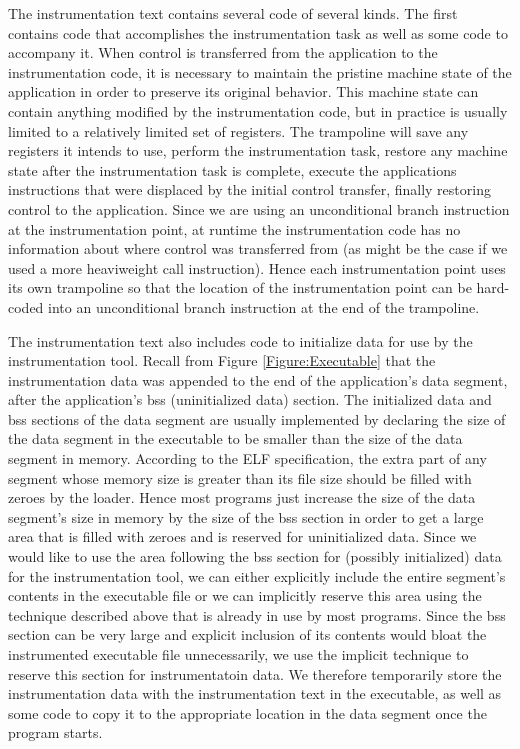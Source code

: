 The instrumentation text contains several code of several kinds. The first
contains code that accomplishes the instrumentation task as well as some code to
accompany it. When control is transferred from the application to the
instrumentation code, it is necessary to maintain the pristine machine state of
the application in order to preserve its original behavior. This machine state
can contain anything modified by the instrumentation code, but in practice is
usually limited to a relatively limited set of registers. The trampoline will
save any registers it intends to use, perform the instrumentation task, restore
any machine state after the instrumentation task is complete, execute the
applications instructions that were displaced by the initial control transfer,
finally restoring control to the application. Since we are using an
unconditional branch instruction at the instrumentation point, at runtime the
instrumentation code has no information about where control was transferred from
(as might be the case if we used a more heaviweight call instruction). Hence
each instrumentation point uses its own trampoline so that the location of the
instrumentation point can be hard-coded into an unconditional branch instruction
at the end of the trampoline.

The instrumentation text also includes code to initialize data for use by the
instrumentation tool. Recall from Figure \ref{Figure:Executable} that the instrumentation
data was appended to the end of the application's data segment, after the
application's bss (uninitialized data) section. The initialized data and bss
sections of the data segment are usually implemented by declaring the size of
the data segment in the executable to be smaller than the size of the data
segment in memory. According to the ELF specification, the extra part of any
segment whose memory size is greater than its file size should be filled with
zeroes by the loader. Hence most programs just increase the size of the data
segment's size in memory by the size of the bss section in order to get a large
area that is filled with zeroes and is reserved for uninitialized data. Since we
would like to use the area following the bss section for (possibly initialized)
data for the instrumentation tool, we can either explicitly include the entire
segment's contents in the executable file or we can implicitly reserve this area
using the technique described above that is already in use by most programs.
Since the bss section can be very large and explicit inclusion of its contents
would bloat the instrumented executable file unnecessarily, we use the implicit
technique to reserve this section for instrumentatoin data. We therefore
temporarily store the instrumentation data with the instrumentation text in the
executable, as well as some code to copy it to the appropriate location in the
data segment once the program starts.
